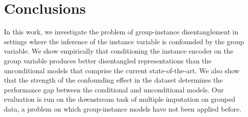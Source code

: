 \documentclass[nohyperref]{article}
\theoremstyle{plain}
\theoremstyle{definition}
\theoremstyle{remark}
\begin{document}
\section{Conclusions}

In this work, we investigate the problem of group-instance disentanglement in settings where the inference of the instance variable is confounded by the group variable. We show empirically that conditioning the instance encoder on the group variable produces better disentangled representations than the unconditional models that comprise the current state-of-the-art. We also show that the strength of the confounding effect in the dataset determines the performance gap between the conditional and unconditional models. Our evaluation is run on the downstream task of multiple imputation on grouped data, a problem on which group-instance models have not been applied before.





\end{document}
